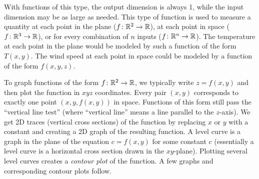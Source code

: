With functions of this type, the output dimension is always 1, while
the input dimension may be as large as needed. This type of function
is used to measure a quantity at each point in the plane ($f\colon {\ensuremath{\mathbb{R}}}^2\to
{\ensuremath{\mathbb{R}}}$), at each point in space ($f\colon {\ensuremath{\mathbb{R}}}^3\to {\ensuremath{\mathbb{R}}}$), or for every
combination of $n$ inputs ($f\colon {\ensuremath{\mathbb{R}}}^n\to {\ensuremath{\mathbb{R}}}$). The temperature at
each point in the plane would be modeled by such a function of the
form $T(x,y)$. The wind speed at each point in space could be modeled
by a function of the form $f(x,y,z)$.

To graph functions of the form {$f\colon {\ensuremath{\mathbb{R}}}^2\to {\ensuremath{\mathbb{R}}}$}, we typically
write $z=f(x,y)$ and then plot the function in $xyz$ coordinates.
Every pair $(x,y)$ corresponds to exactly one point $(x,y,f(x,y))$ in
space.  Functions of this form still pass the ``vertical line test''
(where ``vertical line'' means a line parallel to the $z$-axis).  We
get 2D traces (vertical cross sections) of the function by replacing
$x$ or $y$ with a constant and creating a 2D graph of the resulting
function.  A level curve is a graph in the plane of the equation
$c=f(x,y)$ for some constant $c$ (essentially a level curve is a
horizontal cross section drawn in the $xy$-plane). Plotting several
level curves creates a \emph{contour plot} of the function.  A few
graphs and corresponding contour plots follow.


